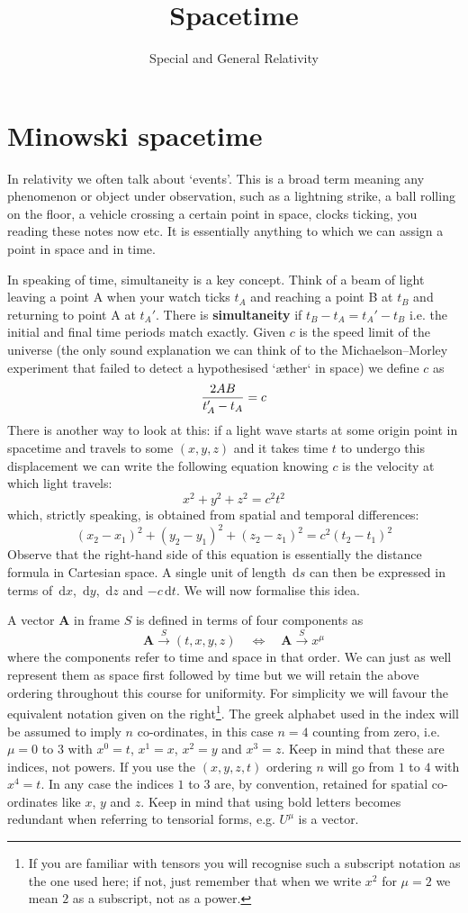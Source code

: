 \documentclass[english,seminar]{lecture}
\title{Spacetime}
\subtitle{Special and General Relativity}
\newcommand{\diff}{\,\textrm{d}}
\begin{document}
\section{Minowski spacetime}\label{sec:minkowskispacetime}
In relativity we often talk about `events'. This is a broad term meaning any phenomenon or object under observation, such as a lightning strike, a ball rolling on the floor, a vehicle crossing a certain point in space, clocks ticking, you reading these notes now etc. It is essentially anything to which we can assign a point in space and in time.

In speaking of time, simultaneity is a key concept. Think of a beam of light leaving a point A when your watch ticks $t_A$ and reaching a point B at $t_B$ and returning to point A at $t_A'$. There is \textbf{simultaneity} if $t_B - t_A = t_A' - t_B$ i.e. the initial and final time periods match exactly. Given $c$ is the speed limit of the universe (the only sound explanation we can think of to the Michaelson--Morley experiment that failed to detect a hypothesised `\ae ther` in space) we define $c$ as
\[
{2AB \over t_A' - t_A} = c
\]
There is another way to look at this: if a light wave starts at some origin point in spacetime and travels to some $(x,y,z)$ and it takes time $t$ to undergo this displacement we can write the following equation knowing $c$ is the velocity at which light travels:
\[
x^2 + y^2 + z^2 = c^2t^2
\]
which, strictly speaking, is obtained from spatial and temporal differences:
\[
(x_2-x_1)^2 + (y_2-y_1)^2 + (z_2-z_1)^2 = c^2 (t_2-t_1)^2
\]
Observe that the right-hand side of this equation is essentially the distance formula in Cartesian space. A single unit of length $\diff s$ can then be expressed in terms of $\diff x$, $\diff y$, $\diff z$ and $-c\diff t$. We will now formalise this idea.

A vector $\mathbf{A}$ in frame $S$ is defined in terms of four components as \[\mathbf{A} \xrightarrow{S} (t,x,y,z) \quad\Longleftrightarrow\quad \mathbf{A} \xrightarrow{S} {x^\mu}\]where the components refer to time and space in that order. We can just as well represent them as space first followed by time but we will retain the above ordering throughout this course for uniformity. For simplicity we will favour the equivalent notation given on the right\footnote{If you are familiar with tensors you will recognise such a subscript notation as the one used here; if not, just remember that when we write $x^2$ for $\mu = 2$ we mean $2$ as a subscript, not as a power.}. The greek alphabet used in the index will be assumed to imply $n$ co-ordinates, in this case $n=4$ counting from zero, i.e. $\mu = 0$ to $3$ with $x^0 = t$, $x^1=x$, $x^2=y$ and $x^3 = z$. Keep in mind that these are indices, not powers. If you use the $(x,y,z,t)$ ordering $n$ will go from $1$ to $4$ with $x^4 = t$. In any case the indices $1$ to $3$ are, by convention, retained for spatial co-ordinates like $x$, $y$ and $z$. Keep in mind that using bold letters becomes redundant when referring to tensorial forms, e.g. $U^\mu$ is a vector.
\end{document}
